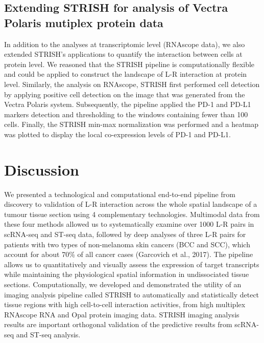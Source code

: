 \subsection{Extending STRISH for analysis of Vectra Polaris mutiplex protein data}
In addition to the analyses at transcriptomic level (RNAscope data), we also extended STRISH’s applications to quantify the interaction between cells at protein level. We reasoned that the STRISH pipeline is computationally flexible and could be applied to construct the landscape of L-R interaction at protein level. Similarly, the analysis on RNAscope, STRISH first performed cell detection by applying positive cell detection on the image that was generated from the Vectra Polaris system. Subsequently, the pipeline applied the PD-1 and PD-L1 markers detection and thresholding to the windows containing fewer than 100 cells. Finally, the STRISH min-max normalization was performed and a heatmap was plotted to display the local co-expression levels of PD-1 and PD-L1.  

\section{Discussion}
We presented a technological and computational end-to-end pipeline from discovery to validation of L-R interaction across the whole spatial landscape of a tumour tissue section using 4 complementary technologies. Multimodal data from these four methods allowed us to systematically examine over 1000 L-R pairs in scRNA-seq and ST-seq data, followed by deep analyses of three L-R pairs for patients with two types of non-melanoma skin cancers (BCC and SCC), which account for about 70\% of all cancer cases (Garcovich et al., 2017). The pipeline allows us to quantitatively and visually assess the expression of target transcripts while maintaining the physiological spatial information in undissociated tissue sections. Computationally, we developed and demonstrated the utility of an imaging analysis pipeline called STRISH to automatically and statistically detect tissue regions with high cell-to-cell interaction activities, from high multiplex RNAscope RNA and Opal protein imaging data. STRISH imaging analysis results are important orthogonal validation of the predictive results from scRNA-seq and ST-seq analysis.  

